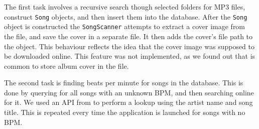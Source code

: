 The first task involves a recursive search though selected folders for MP3 files, construct \texttt{Song} objects, and then insert them into the database. After the \texttt{Song} object is constructed the \texttt{SongScanner} attempts to extract a cover image from the file, and save the cover in a separate file. It then adds the cover's file path to the object. This behaviour reflects the idea that the cover image was supposed to be downloaded online. This feature was not implemented, as we found out that is common to store album cover in the file.

The second task is finding beats per minute for songs in the database. This is done by querying for all songs with an unknown BPM, and then searching online for it. We used an API from \citet{echonest:API} to perform a lookup using the artist name and song title. This is repeated every time the application is launched for songs with no BPM.